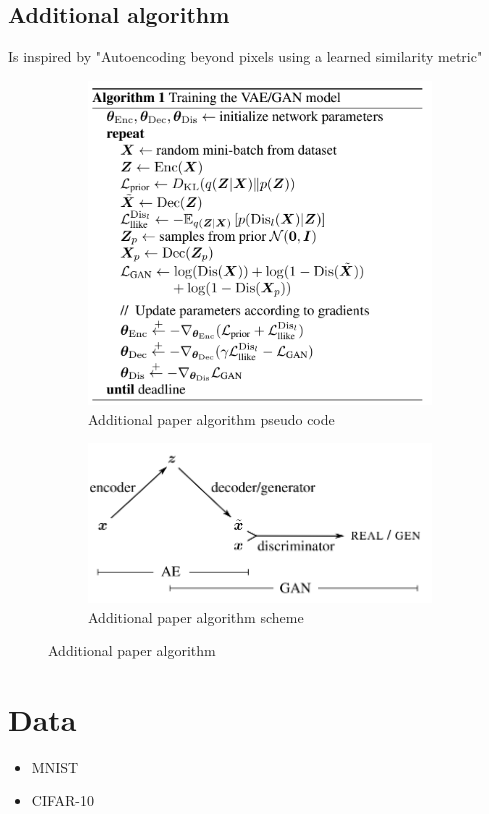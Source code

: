 \documentclass{article}
\begin{document}
    \subsection{Additional algorithm}
    Is inspired by "Autoencoding beyond pixels using a learned similarity metric"\cite{DBLP:journals/corr/LarsenSW15}

    \begin{center}
        \begin{figure}[H]{\textwidth}
            \begin{subfigure}{0.5\textwidth}
                \centering
                \includegraphics[width=0.5\linewidth]{figures/additional-code.png}
                \caption{Additional paper algorithm pseudo code}
            \end{subfigure}
            \begin{subfigure}{0.5\textwidth}
                \centering
                \includegraphics[width=0.5\linewidth]{figures/additional.png}
                \caption{Additional paper algorithm scheme}
            \end{subfigure}%
            \caption{Additional paper algorithm}
        \end{figure}
    \end{center}


    \section{Data}

    \begin{itemize}
        \item MNIST
        \item CIFAR-10
    \end{itemize}
\end{document}
